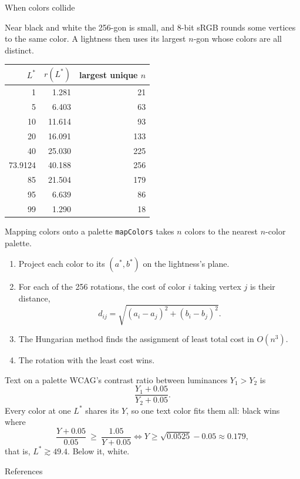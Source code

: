 \begin{slide}{When colors collide}
  \begin{minipage}[c]{0.48\linewidth}
    Near black and white the 256-gon is small, and 8-bit sRGB rounds some
    vertices to the same color. A lightness then uses its largest $n$-gon
    whose colors are all distinct.
  \end{minipage}\hfill
  \begin{minipage}[c]{0.46\linewidth}
    \centering
    \begin{tabular}{rrr}
      \toprule
      $L^*$ & $r(L^*)$ & largest unique $n$ \\
      \midrule
    1 & 1.281 & 21 \\
    5 & 6.403 & 63 \\
    10 & 11.614 & 93 \\
    20 & 16.091 & 133 \\
    40 & 25.030 & 225 \\
    73.9124 & 40.188 & 256 \\
    85 & 21.504 & 179 \\
    95 & 6.639 & 86 \\
    99 & 1.290 & 18 \\
      \bottomrule
    \end{tabular}
  \end{minipage}
\end{slide}

\begin{slide}{Mapping colors onto a palette}
  \texttt{mapColors} takes $n$ colors to the nearest $n$-color palette.
  \begin{enumerate}
    \item Project each color to its $(a^*, b^*)$ on the lightness's plane.
    \item For each of the 256 rotations, the cost of color $i$ taking vertex
      $j$ is their distance,
      \[ d_{ij} = \sqrt{(a_i - a_j)^2 + (b_i - b_j)^2}. \]
    \item The Hungarian method \cite{kuhn, munkres} finds the assignment of
      least total cost in $O(n^3)$.
    \item The rotation with the least cost wins.
  \end{enumerate}
\end{slide}

\begin{slide}{Text on a palette}
  WCAG's contrast ratio \cite{wcag} between luminances $Y_1 > Y_2$ is
  \[ \frac{Y_1 + 0.05}{Y_2 + 0.05}. \]
  Every color at one $L^*$ shares its $Y$, so one text color fits them all:
  black wins where
  \[ \frac{Y + 0.05}{0.05} \ \ge\ \frac{1.05}{Y + 0.05}
     \iff Y \ge \sqrt{0.0525} - 0.05 \approx 0.179, \]
  that is, $L^* \gtrsim 49.4$. Below it, white.
\end{slide}

\begin{slide}{References}
  \nocite{*}
  
  \small
  
\end{slide}


